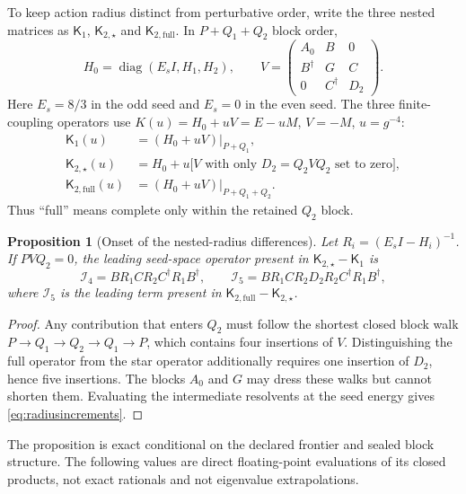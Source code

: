 \documentclass[11pt]{article}
\theoremstyle{plain}
\newtheorem{proposition}[theorem]{Proposition}
\theoremstyle{definition}
\theoremstyle{remark}
\newcommand{\dg}{^{\dagger}}
\begin{document}
To keep action radius distinct from perturbative order, write the three nested
matrices as $\mathsf K_1$, $\mathsf K_{2,\star}$ and
$\mathsf K_{2,\mathrm{full}}$. In $P+Q_1+Q_2$ block order,
\begin{equation}\label{eq:radius2blocks}
 H_0=\operatorname{diag}(E_sI,H_1,H_2),\qquad
 V=\begin{pmatrix}
 A_0&B&0\\ B\dg&G&C\\ 0&C\dg&D_2
 \end{pmatrix}.
\end{equation}
Here $E_s=8/3$ in the odd seed and $E_s=0$ in the even seed. The three
finite-coupling operators use $K(u)=H_0+uV=E-uM$, $V=-M$, $u=g^{-4}$:
\begin{align}
 \mathsf K_1(u)&=(H_0+uV)|_{P+Q_1},\nonumber\\
 \mathsf K_{2,\star}(u)&=H_0+u\bigl[V\text{ with only }D_2=Q_2VQ_2
 \text{ set to zero}\bigr],\label{eq:k2nested}\\
 \mathsf K_{2,\mathrm{full}}(u)&=(H_0+uV)|_{P+Q_1+Q_2}.\nonumber
\end{align}
Thus ``full'' means complete only within the retained $Q_2$ block.

\begin{proposition}[Onset of the nested-radius differences]
\label{prop:radiusonset}
Let $R_i=(E_sI-H_i)^{-1}$. If $PVQ_2=0$, the leading seed-space operator
present in $\mathsf K_{2,\star}-\mathsf K_1$ is
\begin{equation}\label{eq:radiusincrements}
 \mathcal I_4=BR_1CR_2C\dg R_1B\dg,
 \qquad
 \mathcal I_5=BR_1CR_2D_2R_2C\dg R_1B\dg,
\end{equation}
where $\mathcal I_5$ is the leading term present in
$\mathsf K_{2,\mathrm{full}}-\mathsf K_{2,\star}$.
\end{proposition}

\begin{proof}
Any contribution that enters $Q_2$ must follow the shortest closed block walk
$P\to Q_1\to Q_2\to Q_1\to P$, which contains four insertions of $V$.
Distinguishing the full operator from the star operator additionally requires
one insertion of $D_2$, hence five insertions. The blocks $A_0$ and $G$ may
dress these walks but cannot shorten them. Evaluating the intermediate
resolvents at the seed energy gives \eqref{eq:radiusincrements}.
\end{proof}

The proposition is exact conditional on the declared frontier and sealed block
structure. The following values are direct floating-point evaluations of its
closed products, not exact rationals and not eigenvalue extrapolations.
\end{document}
